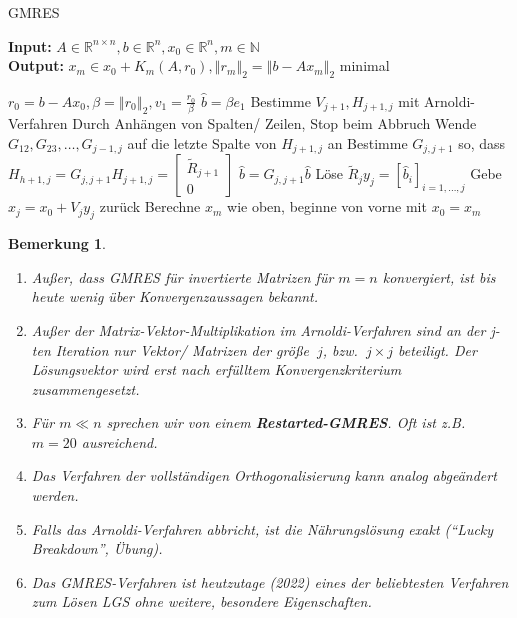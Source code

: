 \documentclass{book}
\newtheorem{remark}[algorithm]{Bemerkung}
\def\R{\mathbb{R}}
\def\N{\mathbb{N}}
\begin{document}
            \begin{algorithm}[H]\label{a3.20} %
                \caption{GMRES}
                \textbf{Input:} $A\in\R^{n\times n},b\in\R^n,x_0\in\R^n,m\in\N$\\
                \textbf{Output:} $x_m\in x_0+K_m(A,r_0),\left\Vert r_m \right\Vert_2=\left\Vert b-Ax_m \right\Vert_2$ minimal
                \begin{algorithmic}
                \State $r_0=b-Ax_0,\beta=\left\Vert r_0 \right\Vert_2,v_1=\frac{r_0}{\beta}$
                \State $\hat{b}=\beta e_1$
                    \State Bestimme $V_{j+1}, H_{j+1,j}$ mit Arnoldi-Verfahren \Comment Durch Anhängen von Spalten/ Zeilen, Stop beim Abbruch
                    \State Wende $G_{12},G_{23},\dots,G_{j-1,j}$ auf die letzte Spalte von $H_{j+1,j}$ an
                    \State Bestimme $G_{j,j+1}$ so, dass $H_{h+1,j}=G_{j,j+1}H_{j+1,j}=\begin{bmatrix}
                        \tilde{R}_{j+1}\\0
                    \end{bmatrix}$
                    \State $\hat{b}=G_{j,j+1}\hat{b}$
                        \State Löse $\tilde{R}_jy_j = [\hat{b}_i]_{i=1,\dots,j}$
                        \State Gebe $x_j=x_0+V_jy_j$ zurück
                    \EndIf
                \EndFor
                \State Berechne $x_m$ wie oben, beginne von vorne mit $x_0=x_m$
                \end{algorithmic}
            \end{algorithm}

            \begin{remark}\label{b3.21}
                \begin{enumerate}
                    \item Außer, dass GMRES für invertierte Matrizen für $m=n$ konvergiert,
                    ist bis heute wenig über Konvergenzaussagen bekannt.
                    \item Außer der Matrix-Vektor-Multiplikation im Arnoldi-Verfahren sind an der j-ten Iteration 
                    nur Vektor/ Matrizen der größe $~j$, bzw. $~j\times j$ beteiligt.
                    Der Lösungsvektor wird erst nach erfülltem Konvergenzkriterium zusammengesetzt.
                    \item Für $m\ll n$ sprechen wir von einem \textbf{Restarted-GMRES}. Oft ist z.B. $m=20$
                    ausreichend.
                    \item Das Verfahren der vollständigen Orthogonalisierung kann analog abgeändert werden.
                    \item Falls das Arnoldi-Verfahren abbricht, ist die Nährungslösung exakt (``Lucky Breakdown'', Übung).
                    \item Das GMRES-Verfahren ist heutzutage (2022) eines der beliebtesten Verfahren zum Lösen LGS ohne
                    weitere, besondere Eigenschaften.
                \end{enumerate}
            \end{remark}
\end{document}
